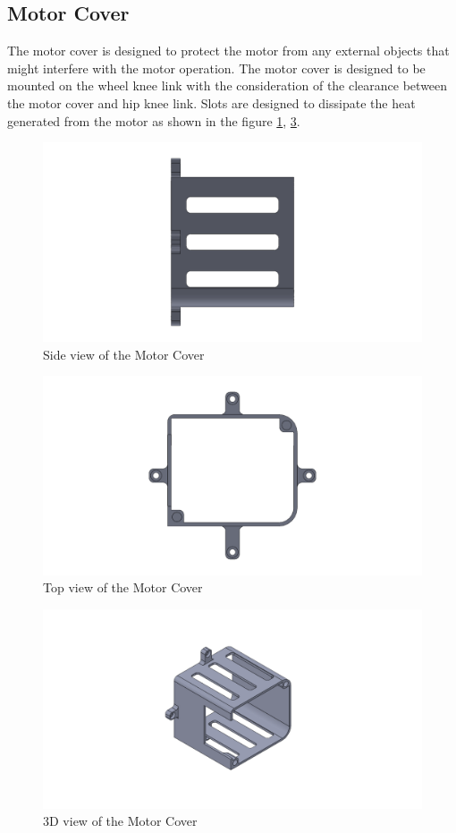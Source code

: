 \subsection{Motor Cover}
The motor cover is designed to protect the motor from any external objects that might interfere with the motor operation.
The motor cover is designed to be mounted on the wheel knee link with the consideration of the clearance between the motor cover and hip knee link.
Slots are designed to dissipate the heat generated from the motor as shown in the figure \ref{fig:motorcover1}, \ref{fig:motorcover3}.
\begin{figure}[h]
	\centering
	\includegraphics[width=.6\linewidth]{motor_cover_1}
	\caption[Side view of the Motor Cover]{Side view of the Motor Cover}
	\label{fig:motorcover1}
\end{figure}
\begin{figure}[h]
	\centering
	\includegraphics[width=.6\linewidth]{motor_cover_2}
	\caption[Top view of the Motor Cover]{Top view of the Motor Cover}
	\label{fig:motorcover2}
\end{figure}
\begin{figure}[h]
	\centering
	\includegraphics[width=.6\linewidth]{motor_cover_3}
	\caption[3D view of the Motor Cover]{3D view of the Motor Cover}
	\label{fig:motorcover3}
\end{figure}


